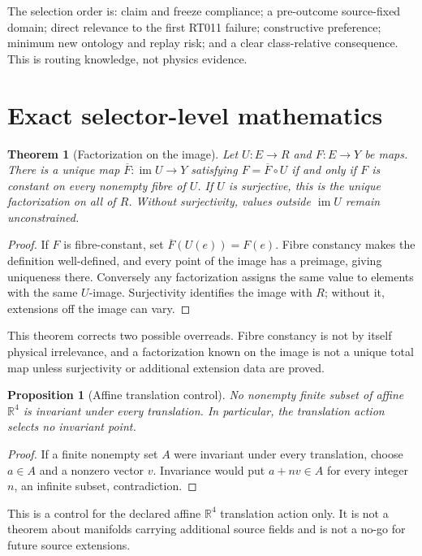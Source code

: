 \documentclass[11pt]{article}
\newtheorem{theorem}{Theorem}
\newtheorem{proposition}{Proposition}
\newcommand{\R}{\mathbb R}
\begin{document}
The selection order is: claim and freeze compliance; a pre-outcome source-fixed
domain; direct relevance to the first RT011 failure; constructive preference;
minimum new ontology and replay risk; and a clear class-relative consequence.
This is routing knowledge, not physics evidence.

\section{Exact selector-level mathematics}

\begin{theorem}[Factorization on the image]
Let \(U:E\to R\) and \(F:E\to Y\) be maps.  There is a unique map
\(\overline F:\operatorname{im}U\to Y\) satisfying
\(F=\overline F\circ U\) if and only if \(F\) is constant on every nonempty
fibre of \(U\).  If \(U\) is surjective, this is the unique factorization on
all of \(R\).  Without surjectivity, values outside \(\operatorname{im}U\)
remain unconstrained.
\end{theorem}

\begin{proof}
If \(F\) is fibre-constant, set \(\overline F(U(e))=F(e)\).  Fibre constancy
makes the definition well-defined, and every point of the image has a
preimage, giving uniqueness there.  Conversely any factorization assigns the
same value to elements with the same \(U\)-image.  Surjectivity identifies
the image with \(R\); without it, extensions off the image can vary.
\end{proof}

This theorem corrects two possible overreads.  Fibre constancy is not by
itself physical irrelevance, and a factorization known on the image is not a
unique total map unless surjectivity or additional extension data are proved.

\begin{proposition}[Affine translation control]
No nonempty finite subset of affine \(\R^4\) is invariant under every
translation.  In particular, the translation action selects no invariant
point.
\end{proposition}

\begin{proof}
If a finite nonempty set \(A\) were invariant under every translation, choose
\(a\in A\) and a nonzero vector \(v\).  Invariance would put
\(a+n v\in A\) for every integer \(n\), an infinite subset, contradiction.
\end{proof}

This is a control for the declared affine \(\R^4\) translation action only.
It is not a theorem about manifolds carrying additional source fields and is
not a no-go for future source extensions.
\end{document}
